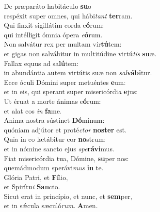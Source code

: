 \evenverse De præparáto habitáculo \textbf{su}o~\*\\
\evenverse respéxit super omnes, qui hábi\textit{tant} \textbf{ter}ram.\\
\oddverse Qui finxit sigillátim corda e\textbf{ó}rum:~\*\\
\oddverse qui intélligit ómnia ópera \textit{e}\textbf{ó}rum.\\
\evenverse Non salvátur rex per multam vir\textbf{tú}tem:~\*\\
\evenverse et gigas non salvábitur in multitúdine virtú\textit{tis} \textbf{su}æ.\\
\oddverse Fallax equus ad sa\textbf{lú}tem:~\*\\
\oddverse in abundántia autem virtútis suæ non \textit{sal}\textbf{vá}\textbf{bi}tur.\\
\evenverse Ecce óculi Dómini super metuéntes \textbf{e}um:~\*\\
\evenverse et in eis, qui sperant super misericórdi\textit{a} \textbf{e}jus:\\
\oddverse Ut éruat a morte ánimas e\textbf{ó}rum:~\*\\
\oddverse et alat eos \textit{in} \textbf{fa}me.\\
\evenverse Anima nostra sústinet \textbf{Dó}minum:~\*\\
\evenverse quóniam adjútor et proté\textit{ctor} \textbf{no}\textbf{ster} est.\\
\oddverse Quia in eo lætábitur cor \textbf{no}strum:~\*\\
\oddverse et in nómine sancto ejus \textit{spe}\textbf{rá}\textbf{vi}mus.\\
\evenverse Fiat misericórdia tua, Dómine, \textbf{su}per nos:~\*\\
\evenverse quemádmodum sperávi\textit{mus} \textbf{in} te.\\
\oddverse Glória Patri, et \textbf{Fí}lio,~\*\\
\oddverse et Spirítu\textit{i} \textbf{San}cto.\\
\evenverse Sicut erat in princípio, et nunc, et \textbf{sem}per,~\*\\
\evenverse et in sǽcula sæculó\textit{rum}. \textbf{A}men.\\
